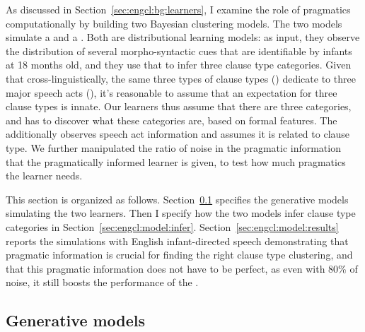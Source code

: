 As discussed in Section~\ref{sec:engcl:bg:learners}, I examine the role of pragmatics computationally by building two Bayesian clustering models. The two models simulate a \distlearner{} and a \praglearner{}. Both are distributional learning models: as input, they observe the distribution of several morpho-syntactic cues that are identifiable by infants at 18 months old, and they use that to infer three clause type categories. Given that cross-linguistically, the same three types of clause types (\diis{}) dedicate to three major speech acts (\aqrs{}), it's reasonable to assume that an expectation for three clause types is innate. Our learners thus assume that there are three categories, and has to discover what these categories are, based on formal features. The \praglearner{} additionally observes speech act information and assumes it is related to clause type. We further manipulated the ratio of noise in the pragmatic information that the pragmatically informed learner is given, to test how much pragmatics the learner needs.


This section is organized as follows. Section~\ref{sec:engcl:model:spec} specifies the generative models simulating the two learners. Then I specify how the two models infer clause type categories in Section~\ref{sec:engcl:model:infer}. Section~\ref{sec:engcl:model:results} reports the simulations with English infant-directed speech demonstrating that pragmatic information is crucial for finding the right clause type clustering, and that this pragmatic information does not have to be perfect, as even with 80\% of noise, it still boosts the performance of the \praglearner{}. 

\subsection{Generative models}
\label{sec:engcl:model:spec}



